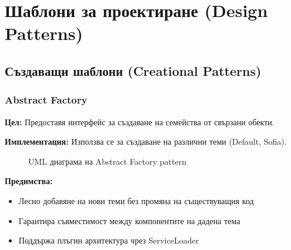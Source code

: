 \documentclass{article}
\begin{document}
	\section{Шаблони за проектиране (Design Patterns)}
	
	\subsection{Създаващи шаблони (Creational Patterns)}
	
	\subsubsection{Abstract Factory}
	
	\textbf{Цел:} Предоставя интерфейс за създаване на семейства от свързани обекти.
	
	\textbf{Имплементация:} Използва се за създаване на различни теми (Default, Sofia).
	
	\begin{figure}[H]
		\centering
		\caption{UML диаграма на Abstract Factory pattern}
	\end{figure}
	
	\textbf{Предимства:}
	\begin{itemize}
		\item Лесно добавяне на нови теми без промяна на съществуващия код
		\item Гарантира съвместимост между компонентите на дадена тема
		\item Поддържа плъгин архитектура чрез ServiceLoader
	\end{itemize}
	
\end{document}
